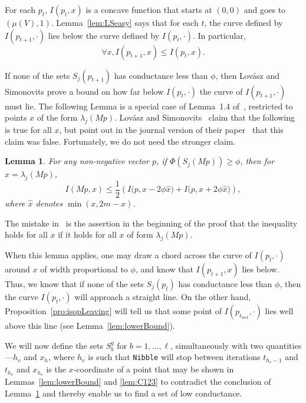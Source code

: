 \documentclass[11pt]{article}
\newtheorem{lemma}[theorem]{Lemma}
\newcommand{\setj}[2]{S_{#1} (#2)}
\newcommand{\lamj}[2]{\lambda_{#1} (#2)}
\def\vol#1{\mu \left(#1  \right)}
\begin{document}
For each $p_{t}$, $I (p_{t},x)$ is a concave function that
  starts at $(0,0)$ and goes to $(\vol{V},1)$.
Lemma~\ref{lem:LSeasy} says that for each $t$, the curve defined
  by $I (p_{t+1}, \cdot)$ lies below the curve defined
  by $I (p_{t}, \cdot)$.
In particular,
\begin{equation}\label{eqn:below}
\forall x, I (p_{t+1}, x) \leq I (p_{t},x).
\end{equation}

If none of the sets $\setj{j}{p_{t+1}}$ has conductance less than $\phi$,
  then Lov\'asz and Simonovits prove a bound on how far below
  $I (p_{t}, \cdot)$ the curve of
  $I (p_{t+1}, \cdot)$ must lie.
The following Lemma is a special case of Lemma~1.4 of~\cite{LovaszSimonovits},
  restricted to points $x$ of the form $\lamj{j}{M p}$.
Lov\'asz and Simonovits~\cite{LovaszSimonovitsFOCS} claim that the following
  is true for all $x$, but point out in the journal version of their 
  paper~\cite{LovaszSimonovits} that this claim was false.
Fortunately, we do not need the stronger claim.

\begin{lemma}\label{lem:LShard}
For any non-negative vector $p$,
  if $\Phi (\setj{j}{M p}) \geq \phi$, then
 for $x = \lamj{j}{M p}$,
\[
  I (M p, x)
\leq
\frac{1}{2}
\left(
I \big(p, x - 2 \phi \widehat{x}\big)
 +
I \big(p, x + 2 \phi \widehat{x} \big)
 \right),
\]
where $\widehat{x}$ denotes $\min (x, 2m-x)$.
\end{lemma}

The mistake in~\cite{LovaszSimonovitsFOCS} is the assertion in the beginning
  of the proof that the inequality holds for all $x$ if it holds for all
  $x$ of form $\lamj{j}{M p}$.

When this lemma applies, one may draw a chord across the curve
  of $I (p_{t}, \cdot)$ around $x$ of width proportional to
  $\phi$, and know that $I (p_{t+1},x)$ lies below.
Thus, we know that if none of the sets $\setj{j}{p_{t}}$
  has conductance less than $\phi$, then the curve
  $I (p_{t}, \cdot)$ will approach a straight line.
On the other hand, Proposition~\ref{pro:isopLeaving} will tell
  us that some point of $I (p_{t_{last}}, \cdot)$ lies well above this line
  (see Lemma~\ref{lem:lowerBound}).

We will now define the sets
 $S^{g}_{b}$
  for $b = 1, \dotsc , \ell $,
  simultaneously with two quantities---$h_{v}$ and $x_{h}$,
  where $h_{v}$ is such that \texttt{Nibble} will stop
  between iterations $t_{h_{v}-1}$ and $t_{h_{v}}$ and $x_{h_{v}}$
  is the $x$-coordinate of a point that 
  may be shown in Lemmas~\ref{lem:lowerBound} and \ref{lem:C123} to
  contradict the conclusion
  of Lemma~\ref{lem:LShard} and thereby enable us to find a set
  of low conductance.
\end{document}
